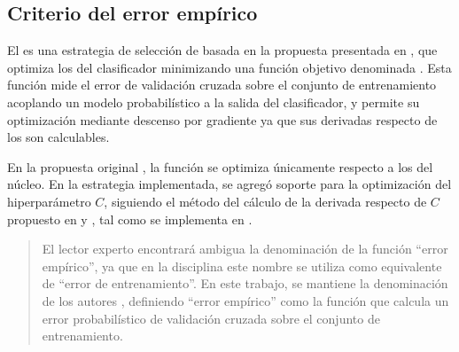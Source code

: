 %
%
\subsection{Criterio del error empírico}
%
El  es una estrategia de selección de
 basada en la propuesta presentada en \cite{ayat}, que
optimiza los  del clasificador minimizando una función
objetivo denominada .
Esta función mide el error de validación cruzada sobre el conjunto de
entrenamiento acoplando un modelo probabilístico a la salida del
clasificador, y permite su optimización mediante descenso por
gradiente ya que sus derivadas respecto de los  son
calculables.

En la propuesta original \cite{ayat}, la función  se
optimiza únicamente respecto a los  del núcleo.
En la estrategia implementada, se agregó soporte para la optimización
del hiperparámetro $C$, siguiendo el método del cálculo de la derivada
respecto de $C$ propuesto en \cite{keerthi} y \cite{glasmachers}, tal
como se implementa en \cite{shark}.

%
\begin{quote}
  El lector experto encontrará ambigua la denominación de la función
  ``error empírico'', ya que en la disciplina este nombre se utiliza
  como equivalente de ``error de entrenamiento''.
  En este trabajo, se mantiene la denominación de los autores
  \cite{ayat}, definiendo ``error empírico'' como la función que
  calcula un error probabilístico de validación cruzada sobre el
  conjunto de entrenamiento.
\end{quote}
%
